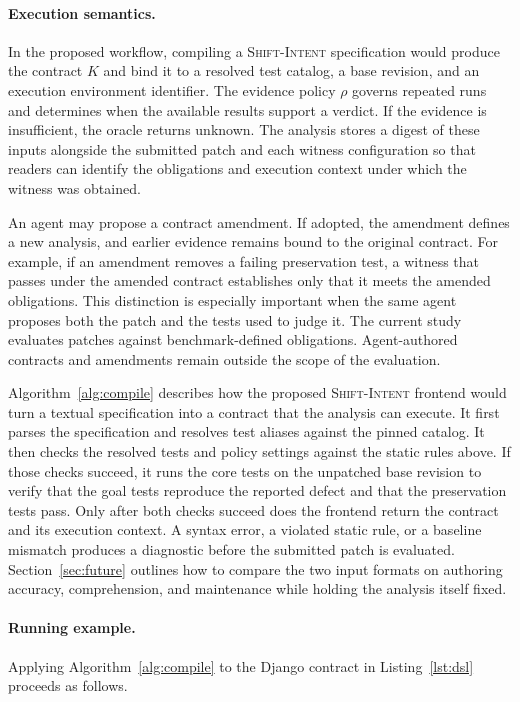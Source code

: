 \documentclass[a4paper,fleqn]{cas-sc}
\newcommand{\dsl}{\textsc{Shift-Intent}}
\newcommand{\lab}[1]{\textsf{#1}}
\begin{document}
\paragraph{Execution semantics.} In the proposed workflow, compiling a \dsl{} specification would produce the contract $K$ and bind it to a resolved test catalog, a base revision, and an execution environment identifier. The evidence policy $\rho$ governs repeated runs and determines when the available results support a verdict. If the evidence is insufficient, the oracle returns \lab{unknown}. The analysis stores a digest of these inputs alongside the submitted patch and each witness configuration so that readers can identify the obligations and execution context under which the witness was obtained.

An agent may propose a contract amendment. If adopted, the amendment defines a new analysis, and earlier evidence remains bound to the original contract. For example, if an amendment removes a failing preservation test, a witness that passes under the amended contract establishes only that it meets the amended obligations. This distinction is especially important when the same agent proposes both the patch and the tests used to judge it. The current study evaluates patches against benchmark-defined obligations. Agent-authored contracts and amendments remain outside the scope of the evaluation.










Algorithm~\ref{alg:compile} describes how the proposed \dsl{} frontend would turn a textual specification into a contract that the analysis can execute. It first parses the specification and resolves test aliases against the pinned catalog. It then checks the resolved tests and policy settings against the static rules above. If those checks succeed, it runs the core tests on the unpatched base revision to verify that the goal tests reproduce the reported defect and that the preservation tests pass. Only after both checks succeed does the frontend return the contract and its execution context. A syntax error, a violated static rule, or a baseline mismatch produces a diagnostic before the submitted patch is evaluated. Section~\ref{sec:future} outlines how to compare the two input formats on authoring accuracy, comprehension, and maintenance while holding the analysis itself fixed.

\paragraph{Running example.} Applying Algorithm~\ref{alg:compile} to the Django contract in Listing~\ref{lst:dsl} proceeds as follows.
\end{document}
